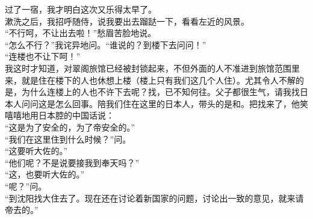 过了一宿，我才明白这次又乐得太早了。\\

漱洗之后，我招呼随侍，说我要出去蹓跶一下，看看左近的风景。\\

“不行呵，不让出去啦！”愁眉苦脸地说。\\

“怎么不行？”我诧异地问。“谁说的？到楼下去问问！”\\

“连楼也不让下呵！”\\

我这时才知道，对翠阁旅馆已经被封锁起来，不但外面的人不准进到旅馆范围里来，就是住在楼下的人也休想上楼（楼上只有我们这几个人住）。尤其令人不解的是，为什么连楼上的人也不许下去呢？找，已不知何往。父子都很生气，请我找日本人问问这是怎么回事。陪我们住在这里的日本人，带头的是和。把找来了，他笑嘻嘻地用日本腔的中国话说：\\

“这是为了安全的，为了帝安全的。”\\

“我们在这里住到什么时候？”问。\\

“这要听大佐的。”\\

“他们呢？不是说要接我到奉天吗？”\\

“这，也要听大佐的。”\\

“呢？”问。\\

“到沈阳找大住去了。现在还在讨论着新国家的问题，讨论出一致的意见，就来请帝去的。”\\

